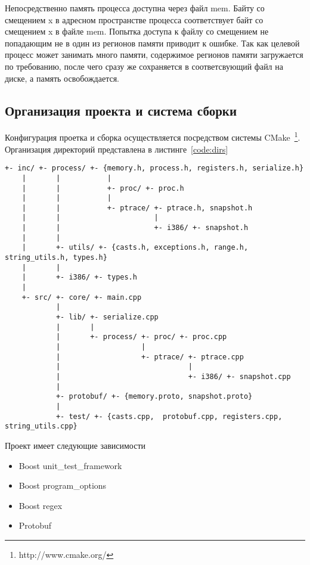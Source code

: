 Непосредственно память процесса доступна через файл mem. Байту со смещением x в адресном пространстве процесса соответствует байт со смещением x в файле mem. Попытка доступа к файлу со смещением не попадающим не в один из регионов памяти приводит к ошибке. Так как целевой процесс может занимать много памяти, содержимое регионов памяти загружается по требованию, после чего сразу же сохраняется в соответсвующий файл на диске, а память освобождается.

\subsection{Организация проекта и система сборки}

Конфигурация проетка и сборка осуществляется посредством системы CMake~\footnote{http://www.cmake.org/}. Организация директорий представлена в листинге~\ref{code:dirs}

\begin{lstlisting}[caption=Организация каталогов, label=code:dirs]
    +- inc/ +- process/ +- {memory.h, process.h, registers.h, serialize.h}
    |       |           |
    |       |           +- proc/ +- proc.h
    |       |           |
    |       |           +- ptrace/ +- ptrace.h, snapshot.h
    |       |                      |
    |       |                      +- i386/ +- snapshot.h
    |       |
    |       +- utils/ +- {casts.h, exceptions.h, range.h, string_utils.h, types.h}
    |       |
    |       +- i386/ +- types.h
    |
    +- src/ +- core/ +- main.cpp
            |
            +- lib/ +- serialize.cpp
            |       |
            |       +- process/ +- proc/ +- proc.cpp
            |                   |
            |                   +- ptrace/ +- ptrace.cpp
            |                              |
            |                              +- i386/ +- snapshot.cpp
            |
            +- protobuf/ +- {memory.proto, snapshot.proto}
            |
            +- test/ +- {casts.cpp,  protobuf.cpp, registers.cpp, string_utils.cpp}
\end{lstlisting}

Проект имеет следующие зависимости

\begin{itemize}

    \item Boost unit\_test\_framework
    \item Boost program\_options
    \item Boost regex
    \item Protobuf

\end{itemize}

